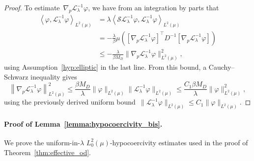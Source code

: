 \documentclass[10pt]{article}
\newcommand{\cL}{\mathcal{L}}
\newcommand{\cLou}{\mathcal S}
\newcommand{\wLmu}{L^2(\mu)}
\newcommand{\wLmuz}{L^2_0(\mu)}
\newcommand{\1}{\mathbbm 1}
\begin{document}
\begin{proof}
    To estimate~$\nabla_p \cL_\lambda^{-1}\varphi$, we have from an integration by parts that
    \begin{equation}
        \begin{aligned}
            \left\langle\varphi,\cL_\lambda^{-1}\varphi \right\rangle_{\wLmu} &= \lambda\left\langle\cLou\cL_\lambda^{-1}\varphi,\cL_\lambda^{-1}\varphi\right\rangle_{\wLmu}\\
            &= -\frac{\lambda}{\beta}\mu\left(\left[\nabla_p\cL_\lambda^{-1}\varphi\right]^\top D^{-1}\left[\nabla_p\cL_\lambda^{-1}\varphi\right]\right)\\
            &\leq -\frac{\lambda}{\beta M_D}\|\nabla_p \cL_\lambda^{-1}\varphi\|^2_{\wLmu},
        \end{aligned}
    \end{equation}
    using Assumption~\ref{hyp:elliptic} in the last line. From this bound, a Cauchy--Schwarz inequality gives
    \begin{equation}
        \label{eq:final_bound_grad_p}
        \left\|\nabla_p \cL_\lambda^{-1}\varphi\right\|^2_{\wLmu}\leq \frac{\beta M_D}{\lambda}\|\varphi\|_{\wLmu}\|\cL_\lambda^{-1}\varphi\|_{\wLmu} \leq \frac{C_1\beta M_D}{\lambda}\|\varphi\|_{\wLmu}^2,
    \end{equation}
    using the previously derived uniform bound~$\|\cL_\lambda^{-1}\varphi\|_{\wLmu} \leq C_1\|\varphi\|_{\wLmu}$.
\end{proof}

\paragraph{Proof of Lemma~\ref{lemma:hypocoercivity_bis}.}
We prove the uniform-in-$\lambda$ $\wLmuz$-hypocoercivity estimates used in the proof of Theorem~\ref{thm:effective_od}.
\end{document}
